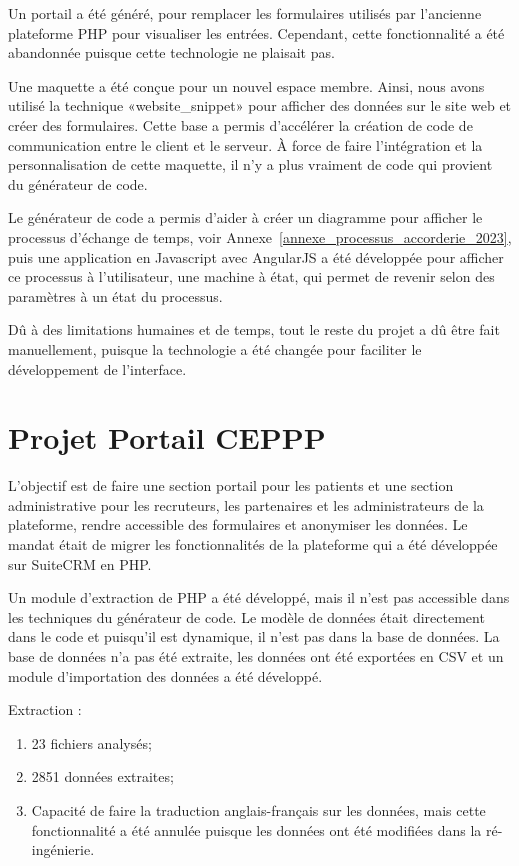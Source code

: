 Un portail a été généré, pour remplacer les formulaires utilisés par l'ancienne plateforme PHP pour visualiser les entrées. Cependant, cette fonctionnalité a été abandonnée puisque cette technologie ne plaisait pas.

Une maquette a été conçue pour un nouvel espace membre. Ainsi, nous avons utilisé la technique «website\_snippet» pour afficher des données sur le site web et créer des formulaires. Cette base a permis d’accélérer la création de code de communication entre le client et le serveur. À force de faire l’intégration et la personnalisation de cette maquette, il n’y a plus vraiment de code qui provient du générateur de code.

Le générateur de code a permis d’aider à créer un diagramme pour afficher le processus d’échange de temps, voir Annexe~\ref{annexe_processus_accorderie_2023}, puis une application en Javascript avec AngularJS a été développée pour afficher ce processus à l’utilisateur, une machine à état, qui permet de revenir selon des paramètres à un état du processus.

Dû à des limitations humaines et de temps, tout le reste du projet a dû être fait manuellement, puisque la technologie a été changée pour faciliter le développement de l’interface.

\section{Projet Portail CEPPP}

L'objectif est de faire une section portail pour les patients et une section administrative pour les recruteurs, les partenaires et les administrateurs de la plateforme, rendre accessible des formulaires et anonymiser les données. Le mandat était de migrer les fonctionnalités de la plateforme qui a été développée sur SuiteCRM en PHP.

Un module d'extraction de PHP a été développé, mais il n'est pas accessible dans les techniques du générateur de code. Le modèle de données était directement dans le code et puisqu'il est dynamique, il n'est pas dans la base de données. La base de données n'a pas été extraite, les données ont été exportées en CSV et un module d'importation des données a été développé.

Extraction : 
\begin{enumerate}
    \item 23 fichiers analysés;
    \item 2851 données extraites;
    \item Capacité de faire la traduction anglais-français sur les données, mais cette fonctionnalité a été annulée puisque les données ont été modifiées dans la ré-ingénierie.
\end{enumerate}

